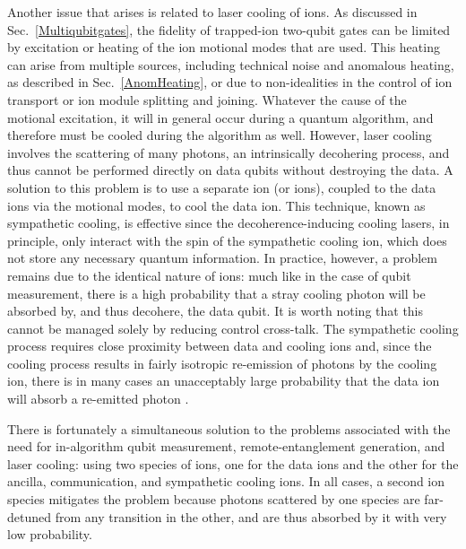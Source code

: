 \documentclass[%
12pt,
 amsmath,amssymb,
]{revtex4-2}
\begin{document}
Another issue that arises is related to laser cooling of ions. As discussed in Sec.~\ref{Multiqubitgates}, the fidelity of trapped-ion two-qubit gates can be limited by excitation or heating of the ion motional modes that are used.  This heating can arise from multiple sources, including technical noise and anomalous heating, as described in Sec.~\ref{AnomHeating}, or due to non-idealities in the control of ion transport or ion module splitting and joining.  Whatever the cause of the motional excitation, it will in general occur during a quantum algorithm, and therefore must be cooled during the algorithm as well.  However, laser cooling involves the scattering of many photons, an intrinsically decohering process, and thus cannot be performed directly on data qubits without destroying the data.  A solution to this problem is to use a separate ion (or ions), coupled to the data ions via the motional modes, to cool the data ion.  This technique, known as sympathetic cooling, is effective since the decoherence-inducing cooling lasers, in principle, only interact with the spin of the sympathetic cooling ion, which does not store any necessary quantum information.  In practice, however, a problem remains due to the identical nature of ions: much like in the case of qubit measurement, there is a high probability that a stray cooling photon will be absorbed by, and thus decohere, the data qubit.  It is worth noting that this cannot be managed solely by reducing control cross-talk.  The sympathetic cooling process requires close proximity between data and cooling ions and, since the cooling process results in fairly isotropic re-emission of photons by the cooling ion, there is in many cases an unacceptably large probability that the data ion will absorb a re-emitted photon \cite{BruzewiczQLAR2017}.

There is fortunately a simultaneous solution to the problems associated with the need for in-algorithm qubit measurement, remote-entanglement generation, and laser cooling: using two species of ions, one for the data ions and the other for the ancilla, communication, and sympathetic cooling ions.  In all cases, a second ion species mitigates the problem because photons scattered by one species are far-detuned from any transition in the other, and are thus absorbed by it with very low probability.
\end{document}
